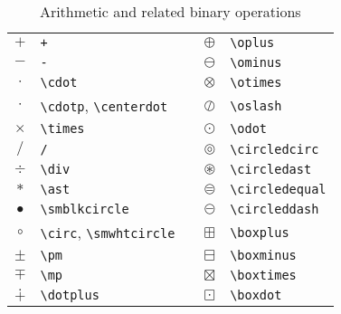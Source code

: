 \documentclass[captions=tableheading]{scrartcl}
\begin{document}
\begin{table}
  \caption{Arithmetic and related binary operations}
  \label{tab:arithmetic-and-related}
  \centering
  \begin{tabular}[c]{clp{1pt}cl}
    \toprule
    $+$ & \verb|+| & & $\oplus$ & \verb|\oplus| \\
    $-$ & \verb|-| & & $\ominus$ & \verb|\ominus| \\
    $\cdot$ & \verb|\cdot| & & $\otimes$ & \verb|\otimes| \\
    $\cdotp$ & \verb|\cdotp|, \verb|\centerdot| & &
    $\oslash$ & \verb|\oslash| \\
    $\times$ & \verb|\times| & & $\odot$ & \verb|\odot| \\
    $/$ & \verb|/| & & $\circledcirc$ & \verb|\circledcirc| \\
    $\div$ & \verb|\div| & & $\circledast$ & \verb|\circledast| \\
    $\ast$ & \verb|\ast| & & $\circledequal$ & \verb|\circledequal| \\
    $\smblkcircle$ & \verb|\smblkcircle| & &
    $\circleddash$ & \verb|\circleddash| \\
    $\circ$ & \verb|\circ|, \verb|\smwhtcircle| & &
    $\boxplus$ & \verb|\boxplus| \\
    $\pm$ & \verb|\pm| & & $\boxminus$ & \verb|\boxminus| \\
    $\mp$ & \verb|\mp| & & $\boxtimes$ & \verb|\boxtimes| \\
    $\dotplus$ & \verb|\dotplus| & & $\boxdot$ & \verb|\boxdot| \\
    \bottomrule
  \end{tabular}
\end{table}
\end{document}
